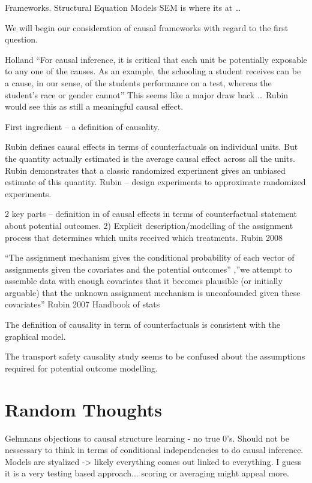 \documentclass[11pt,a4paper]{article}
\begin{document}
Frameworks. Structural Equation Models SEM is where its at …

We will begin our consideration of causal frameworks with regard to the first question. 

Holland “For causal inference, it is critical that each unit be potentially exposable to any one of the causes. As an example, the schooling a student receives can be a cause, in our sense, of the students performance on a test, whereas the student's race or gender cannot” This seems like a major draw back … Rubin would see this as still a meaningful causal effect. 

First ingredient – a definition of causality. 

Rubin defines causal effects in terms of counterfactuals on individual units. But the quantity actually estimated is the average causal effect across all the units. Rubin demonstrates that a classic randomized experiment gives an unbiased estimate of this quantity. Rubin – design experiments to approximate randomized experiments.

2 key parts – definition in of causal effects in terms of counterfactual statement about potential outcomes. 2) Explicit description/modelling of the assignment process that determines which units received which treatments. Rubin 2008

“The assignment mechanism gives the conditional probability of each vector of assignments given the covariates and the potential outcomes” ,”we attempt to assemble data with 
enough covariates that it becomes plausible (or initially arguable) that the 
unknown assignment mechanism is unconfounded given these covariates” 
Rubin 2007 Handbook of stats

The definition of causality in term of counterfactuals is consistent with the graphical model.


The transport safety causality study seems to be confused about the assumptions required for potential outcome modelling. 


\section*{Random Thoughts}
Gelmnans objections to causal structure learning - no true 0's. Should not be nessessary to think in terms of conditional independencies to do causal inference. Models are styalized -> likely everything comes out linked to everything. I guess it is a very testing based approach... scoring or averaging might appeal more. 
\end{document}
